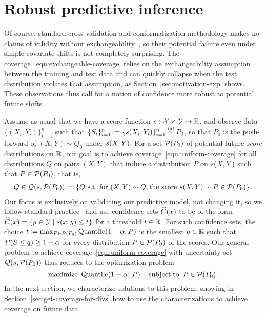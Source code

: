 
\section{Robust predictive inference}
\label{sec:robustpredinference}

Of course, standard cross validation and conformalization methodology makes
no claims of validity without exchangeability~\cite{VovkGaSh05,
  BarberCaRaTi19a}, so their potential failure even under simple
covariate shifts is not completely surprising.  The
coverage~\eqref{eqn:exchangeable-coverage} relies on the exchangeability
assumption between the training and test data and can quickly
collapse when the test distribution violates that assumption, as
Section~\ref{sec:motivation-exp} shows.  These observations thus call for a
notion of confidence more robust to potential future shifts.


Assume as usual that we have a score function $s: \mathcal{X} \times \mathcal{Y}
\to \mathbb{R}$, and observe data $\{(X_i, Y_i) \}_{i=1}^n$ such that $\{
S_i\}_{i=1}^n \coloneqq \{ s(X_i, Y_i) \}_{i=1}^n \stackrel{\rm iid}{\sim} P_0$,
so that $P_0$ is the push-forward of $(X, Y) \sim Q_0$ under $s(X, Y)$.
For a set $\mathcal{P}(P_0)$ of potential future \emph{score} distributions on
$\mathbb{R}$, our goal is to achieve
coverage~\eqref{eqn:uniform-coverage} for all distributions
$Q$ on pairs $(X,Y)$ that induce a distribution $P$ on $s(X, Y)$
such that $P \in \mathcal{P}(P_0)$, that is,
\begin{align*}
  Q \in \mathcal{Q}(s, \mathcal{P}(P_0)) \coloneqq \left\{ Q
  ~ \mbox{s.t.~for}~
  (X,Y) \sim Q, \mbox{the score}~ s(X,Y) \sim P \in \mathcal{P}(P_0) \right\}. 
\end{align*}
Our focus is exclusively on validating our predictive model, not changing
it, so we follow standard practice~\cite{VovkGaSh05,
  BarberCaRaTi19a} and use confidence sets $\widehat{C}(x)$ to be of the form
$\widehat{C}(x) = \{y \in \mathcal{Y} \mid s(x,y) \le t \}$ for a threshold $t \in
\mathbb{R}$.  
For such confidence sets, the choice $t \coloneqq \max_{P \in
  \mathcal{P}(P_0)} \textup{Quantile}(1-\alpha,P) $ is the smallest $q \in \mathbb{R}$ such that
$P(S \le q) \ge 1-\alpha$ for every distribution $P \in \mathcal{P}(P_0)$
of the scores.  Our general problem to achieve
coverage~\eqref{eqn:uniform-coverage} with uncertainty set $\mathcal{Q}(s,
\mathcal{P}(P_0))$ thus reduces to the optimization problem
\begin{equation}
\label{eqn:robust-quantile-prob}
\mathop{\rm maximize} ~ \textup{Quantile}( 1-\alpha; \, P ) ~~~
\mathop{\rm subject\;to} ~ P \in \mathcal{P}(P_0).
\end{equation}
In the next section, we characterize solutions to this problem,
showing in Section~\ref{sec:get-coverage-for-divs} how
to use the characterizations to achieve coverage on future data.

